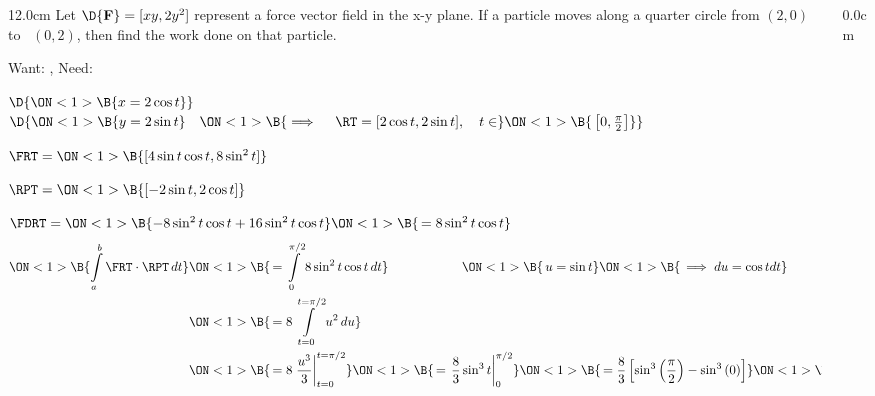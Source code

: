 \begin{frame}
\frametitle{}
\scriptsize
\begin{columns}\begin{column}{12.0cm}
\EX Let $\D{\bf F} = [xy,2y^2]$ represent a force vector field in the x-y plane.  If a particle moves along a quarter circle from $(2,0)$ \, to \, $(0,2)$, then find the work done on that particle.

Want: 
, \quad Need: 

\vspace{0.2cm}


\vspace{0.2cm}

$\D{
\ON<1>{\B{x = 2\cos t}}}$\\
$\D{
\ON<1>{\B{y = 2\sin t}} \quad 
\ON<1>{\B{\implies \quad \RT = [2\cos t, 2\sin t], \quad t \in }}
\ON<1>{\B{\, \left[0, \frac{\pi}{2}\right]}} } $\\

\vspace{0.2cm}

$\FRT = 
\ON<1>{\B{[4\sin t\cos t,8\sin^2 t]}}$
	
\vspace{0.2cm}
	
$\RPT = 
\ON<1>{\B{[-2\sin t, 2\cos t]}}$
	
\vspace{0.2cm}
	
$\FDRT = 
\ON<1>{\B{-8\sin^2 t\cos t + 16\sin^2 t\cos t}} 
\ON<1>{\B{\, = 8\sin^2 t\cos t}}$
\begin{align*}
	\ON<1>{\B{\int \limits_{a}^{b} \FRT \cdot \RPT \, dt}}  
		& \ON<1>{\B{\, = \int \limits_{0}^{\pi/2} 8\sin^2 t\cos t \, dt}} \hspace{2.0cm}
		\ON<1>{\B{\, u=\sin t}} 
		\ON<1>{\B{\, \implies du=\cos t dt}} \\
		& \ON<1>{\B{\, = 8\int \limits_{t=0}^{t=\pi/2} u^2 \, du}}\\
		& \ON<1>{\B{\, = 8\left.\frac{u^3}{3}\right|_{t=0}^{t=\pi/2}}}
		  \ON<1>{\B{\, = \left.\frac{8}{3}\sin^3t\right|_{0}^{\pi/2}}}
		  \ON<1>{\B{\, = \frac{8}{3}\left[\sin^3\left(\frac{\pi}{2}\right) - \sin^3\left(0\right)\right]}}
		  \ON<1>{\B{\, = \frac{8}{3}}}  \\
\end{align*}

\vspace{9.6cm}

\end{column}\begin{column}{0.0cm}\end{column}\end{columns}
\end{frame}

